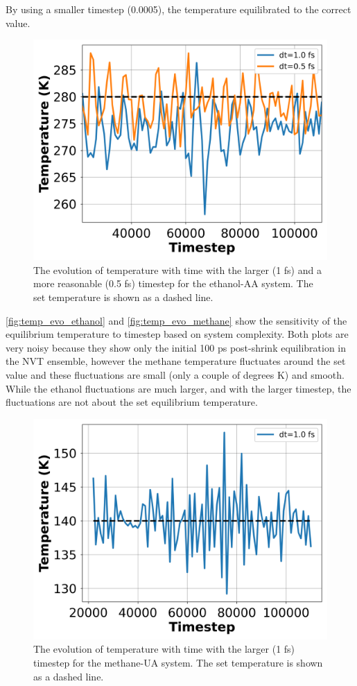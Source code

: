 By using a smaller timestep (0.0005), the temperature equilibrated to the correct value.
\begin{figure}[h!]
    \centering
    \includegraphics[width=0.8\linewidth,keepaspectratio]{figures/rep_study/temp_evolution.png}
    \caption{The evolution of temperature with time with the larger (1 fs) and a more reasonable (0.5 fs) timestep for the ethanol-AA system. The set temperature is shown as a dashed line. }\label{fig:temp_evo_ethanol}
\end{figure}
\autoref{fig:temp_evo_ethanol} and \autoref{fig:temp_evo_methane} show the sensitivity of the equilibrium temperature to timestep based on system complexity. Both plots are very noisy because they show only the initial 100 ps post-shrink equilibration in the NVT ensemble, however the methane temperature fluctuates around the set value and these fluctuations are small (only a couple of degrees K) and smooth. While the ethanol fluctuations are much larger, and with the larger timestep, the fluctuations are not about the set equilibrium temperature.
\begin{figure}[h!]
    \centering
    \includegraphics[width=0.8\linewidth,keepaspectratio]{figures/rep_study/temp_evolution_methane.png}
    \caption{The evolution of temperature with time with the larger (1 fs) timestep for the methane-UA system. The set temperature is shown as a dashed line.}\label{fig:temp_evo_methane}
\end{figure}



